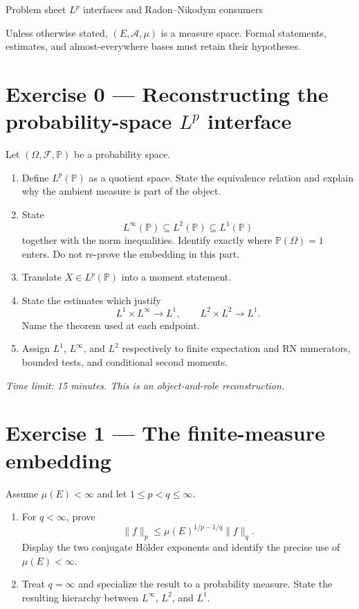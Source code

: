 \sheettitle
  {Problem sheet}
  {$L^p$ interfaces and Radon--Nikodym consumers}

Unless otherwise stated, $(E,\mathcal A,\mu)$ is a measure space. Formal statements, estimates, and almost-everywhere bases must retain their hypotheses.

\section*{Exercise 0 — Reconstructing the probability-space $L^p$ interface}

Let $(\Omega,\mathcal F,\mathbb P)$ be a probability space.
\begin{enumerate}
  \item Define $L^p(\mathbb P)$ as a quotient space. State the equivalence relation and explain why the ambient measure is part of the object.
  \item State
  \[
  L^\infty(\mathbb P)
  \subseteq
  L^2(\mathbb P)
  \subseteq
  L^1(\mathbb P)
  \]
  together with the norm inequalities. Identify exactly where $\mathbb P(\Omega)=1$ enters. Do not re-prove the embedding in this part.
  \item Translate $X\in L^p(\mathbb P)$ into a moment statement.
  \item State the estimates which justify
  \[
  L^1\times L^\infty\longrightarrow L^1,
  \qquad
  L^2\times L^2\longrightarrow L^1.
  \]
  Name the theorem used at each endpoint.
  \item Assign $L^1$, $L^\infty$, and $L^2$ respectively to finite expectation and RN numerators, bounded tests, and conditional second moments.
\end{enumerate}

\emph{Time limit: 15 minutes. This is an object-and-role reconstruction.}

\section*{Exercise 1 — The finite-measure embedding}

Assume $\mu(E)<\infty$ and let $1\le p<q\le\infty$.
\begin{enumerate}
  \item For $q<\infty$, prove
  \[
  \|f\|_p
  \le
  \mu(E)^{1/p-1/q}\|f\|_q.
  \]
  Display the two conjugate Hölder exponents and identify the precise use of $\mu(E)<\infty$.
  \item Treat $q=\infty$ and specialize the result to a probability measure. State the resulting hierarchy between $L^\infty$, $L^2$, and $L^1$.
\end{enumerate}

